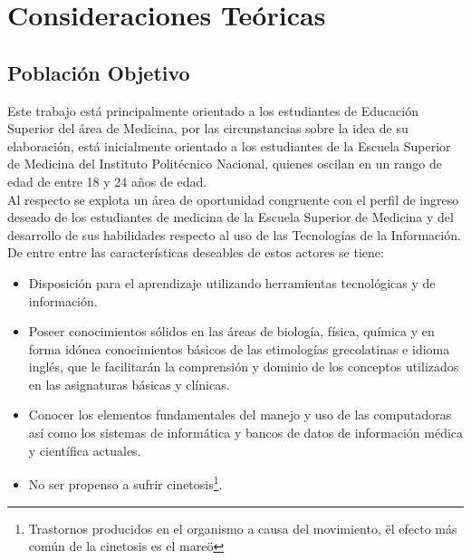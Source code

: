 \chapter{Consideraciones Teóricas}

\section{Poblaci\'on Objetivo}
Este trabajo está principalmente orientado a los estudiantes de Educación Superior del área de Medicina, 
por las circunstancias sobre la idea de su elaboración, está inicialmente orientado a los estudiantes 
de la Escuela Superior de Medicina del Instituto Politécnico Nacional, quienes oscilan en un rango de edad 
de entre 18 y 24 años de edad.\\
Al respecto se explota un área de oportunidad congruente con el perfil de ingreso deseado de los estudiantes 
de medicina de la Escuela Superior de Medicina y del desarrollo de sus habilidades respecto al uso de las 
Tecnologías de la Información.\\
De entre entre las características deseables\cite{web5} de estos actores se tiene:
\begin{itemize}
	\item Disposición para el aprendizaje utilizando herramientas tecnológicas y de información.
	\item Poseer conocimientos sólidos en las áreas de biología, física, química y en forma idónea conocimientos básicos de las etimologías grecolatinas e idioma inglés, que le facilitarán la comprensión y dominio de los conceptos utilizados en las asignaturas básicas y clínicas.
	\item Conocer los elementos fundamentales del manejo y uso de las computadoras así como los sistemas de informática y bancos de datos de información médica y científica actuales.
	\item No ser propenso a sufrir cinetosis\footnote{Trastornos producidos en el organismo a causa del movimiento, \"el efecto más común de la cinetosis es el mareo\"}.
\end{itemize}

